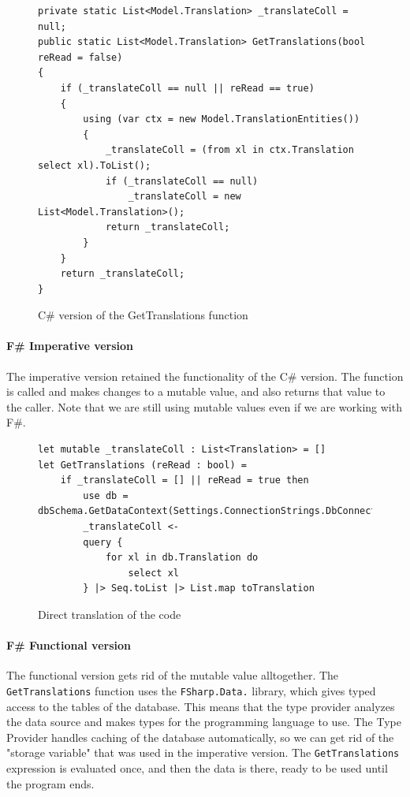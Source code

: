 \documentclass[12pt, a4paper]{article}
\newcommand{\code}[1]{{\small \texttt{#1}}}
\begin{document}
\begin{figure}[!h]
\begin{lstlisting}
private static List<Model.Translation> _translateColl = null; 
public static List<Model.Translation> GetTranslations(bool reRead = false)
{
    if (_translateColl == null || reRead == true)
    {
        using (var ctx = new Model.TranslationEntities())
        {
            _translateColl = (from xl in ctx.Translation select xl).ToList();
            if (_translateColl == null)
                _translateColl = new List<Model.Translation>();
            return _translateColl;
        }
    }
    return _translateColl;
}
\end{lstlisting}
\caption{C\# version of the GetTranslations function}
\end{figure}

\newpage


\paragraph{F\# Imperative version} The imperative version retained the functionality of the C\# version. The function is called and makes changes to a mutable value, and also returns that value to the caller. Note that we are still using mutable values even if we are working with F\#.

\begin{figure}[!h]
\begin{lstlisting}
let mutable _translateColl : List<Translation> = []
let GetTranslations (reRead : bool) =
    if _translateColl = [] || reRead = true then
        use db = dbSchema.GetDataContext(Settings.ConnectionStrings.DbConnectionString)
        _translateColl <- 
        query {
            for xl in db.Translation do 
                select xl
        } |> Seq.toList |> List.map toTranslation
\end{lstlisting}
\caption{Direct translation of the code}
\end{figure}

\newpage


\paragraph{F\# Functional version} The functional version gets rid of the mutable value alltogether. The \code{GetTranslations} function uses the \code{FSharp.Data.}\newline \code{TypeProviders} library, which gives typed access to the tables of the database. This means that the type provider analyzes the data source and makes types for the programming language to use. The Type Provider handles caching of the database automatically, so we can get rid of the "storage variable" that was used in the imperative version. The \code{GetTranslations} expression is evaluated once, and then the data is there, ready to be used until the program ends.
\end{document}
